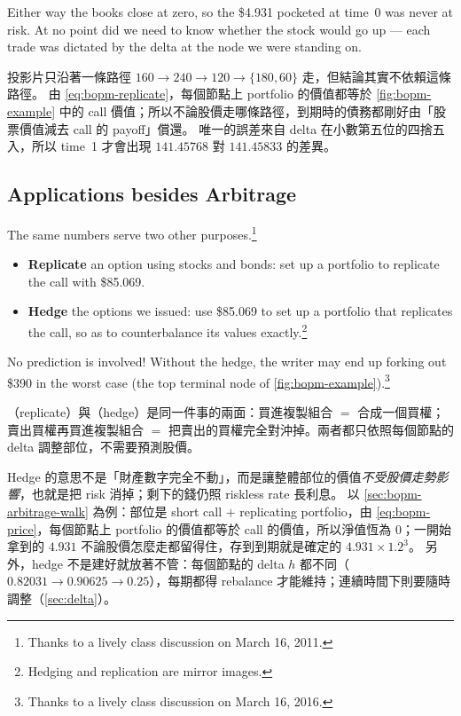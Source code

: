 \begin{moral}
	Either way the books close at zero, so the \$4.931 pocketed at time~0 was never at risk.
	At no point did we need to know whether the stock would go up --- each trade was dictated by the delta at the node we were standing on.
\end{moral}

\begin{note}
	投影片只沿著一條路徑 $160\to240\to120\to\{180,60\}$ 走，但結論其實不依賴這條路徑。
	由 \eqref{eq:bopm-replicate}，每個節點上 portfolio 的價值都等於 \autoref{fig:bopm-example} 中的 call 價值；所以不論股價走哪條路徑，到期時的債務都剛好由「股票價值減去 call 的 payoff」償還。
	唯一的誤差來自 delta 在小數第五位的四捨五入，所以 time~1 才會出現 $141.45768$ 對 $141.45833$ 的差異。
\end{note}
\suppend

\subsection{Applications besides Arbitrage}


The same numbers serve two other purposes.\footnote{Thanks to a lively class discussion on March 16, 2011.}
\begin{itemize}[itemsep=0.3em]
	\item \textbf{Replicate} an option using stocks and bonds: set up a portfolio to replicate the call with \$85.069.
	\item \textbf{Hedge} the options we issued: use \$85.069 to set up a portfolio that replicates the call, so as to counterbalance its values exactly.\footnote{Hedging and replication are mirror images.}
\end{itemize}
No prediction is involved!
Without the hedge, the writer may end up forking out \$390 in the worst case (the top terminal node of \autoref{fig:bopm-example}).\footnote{Thanks to a lively class discussion on March 16, 2016.}

\suppstart
\begin{remark}
	（replicate）與（hedge）是同一件事的兩面：買進複製組合 $=$ 合成一個買權；賣出買權再買進複製組合 $=$ 把賣出的買權完全對沖掉。兩者都只依照每個節點的 delta 調整部位，不需要預測股價。
\end{remark}

\begin{note}
	Hedge 的意思不是「財產數字完全不動」，而是讓整體部位的價值\emph{不受股價走勢影響}，也就是把 risk 消掉；剩下的錢仍照 riskless rate 長利息。
	以 \autoref{sec:bopm-arbitrage-walk} 為例：部位是 short call $+$ replicating portfolio，由 \eqref{eq:bopm-price}，每個節點上 portfolio 的價值都等於 call 的價值，所以淨值恆為 $0$；一開始拿到的 $4.931$ 不論股價怎麼走都留得住，存到到期就是確定的 $4.931\times1.2^{3}$。
	另外，hedge 不是建好就放著不管：每個節點的 delta $h$ 都不同（$0.82031\to0.90625\to0.25$），每期都得 rebalance 才能維持；連續時間下則要隨時調整（\autoref{sec:delta}）。
\end{note}
\suppend

